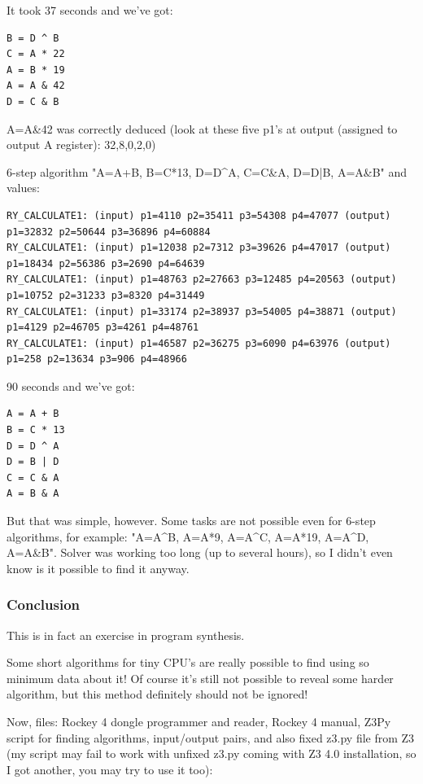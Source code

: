It took 37 seconds and we've got:

\begin{lstlisting}
B = D ^ B
C = A * 22
A = B * 19
A = A & 42
D = C & B
\end{lstlisting}

A=A\&42 was correctly deduced (look at these five p1's at output (assigned to output A register): 32,8,0,2,0)

6-step algorithm "A=A+B, B=C*13, D=D\^{}A, C=C\&A, D=D|B, A=A\&B" and values:

\begin{lstlisting}
RY_CALCULATE1: (input) p1=4110 p2=35411 p3=54308 p4=47077 (output) p1=32832 p2=50644 p3=36896 p4=60884
RY_CALCULATE1: (input) p1=12038 p2=7312 p3=39626 p4=47017 (output) p1=18434 p2=56386 p3=2690 p4=64639
RY_CALCULATE1: (input) p1=48763 p2=27663 p3=12485 p4=20563 (output) p1=10752 p2=31233 p3=8320 p4=31449
RY_CALCULATE1: (input) p1=33174 p2=38937 p3=54005 p4=38871 (output) p1=4129 p2=46705 p3=4261 p4=48761
RY_CALCULATE1: (input) p1=46587 p2=36275 p3=6090 p4=63976 (output) p1=258 p2=13634 p3=906 p4=48966
\end{lstlisting}

90 seconds and we've got:

\begin{lstlisting}
A = A + B
B = C * 13
D = D ^ A
D = B | D
C = C & A
A = B & A
\end{lstlisting}

But that was simple, however. 
Some tasks are not possible even for 6-step algorithms, for example: "A=A\^{}B, A=A*9, A=A\^{}C, A=A*19, A=A\^{}D, A=A\&B".
Solver was working too long (up to several hours), so I didn't even know is it possible to find it anyway.\\

\subsubsection{Conclusion}

This is in fact an exercise in program synthesis.

Some short algorithms for tiny CPU's are really possible to find using so minimum data about it! 
Of course it's still not possible to reveal some harder algorithm, but this method definitely should not be ignored!

Now, files: Rockey 4 dongle programmer and reader, Rockey 4 manual, Z3Py script for finding algorithms, input/output pairs, and also fixed z3.py file from Z3 (my script may fail to work with unfixed z3.py coming with Z3 4.0 installation, so I got another, you may try to use it too):

